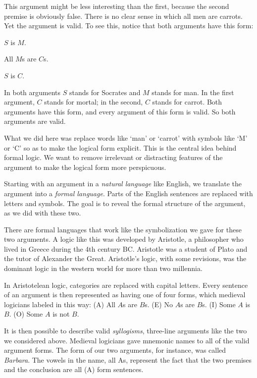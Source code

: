 This argument might be less interesting than the first, because the second premise is obviously false. There is no clear sense in which all men are carrots. Yet the argument is valid. To see this, notice that both arguments have this form:

\begin{earg}
\item[] $S$ is $M$.
\item[] All $M$s are $C$s.
\item[\therefore] $S$ is $C$.
\end{earg}

In both arguments $S$ stands for Socrates and $M$ stands for man. In the first argument, $C$ stands for mortal; in the second, $C$ stands for carrot. Both arguments have this form, and every argument of this form is valid. So both arguments are valid.


What we did here was replace words like `man' or `carrot' with symbols like `M' or `C' so as to make the logical form explicit. This is the central idea behind formal logic. We want to remove irrelevant or distracting features of the argument to make the logical form more perspicuous.

Starting with an argument in a \emph{natural language} like English, we translate the argument into a \emph{formal language}. Parts of the English sentences are replaced with letters and symbols. The goal is to reveal the formal structure of the argument, as we did with these two.

There are formal languages that work like the symbolization we gave for these two arguments. A logic like this was developed by Aristotle, a philosopher who lived in Greece during the 4th century BC. Aristotle was a student of Plato and the tutor of Alexander the Great. Aristotle's logic, with some revisions, was the dominant logic in the western world for more than two millennia.

In Aristotelean logic, categories are replaced with capital letters. Every sentence of an argument is then represented as having one of four forms, which medieval logicians labeled in this way: (A) All $A$s are $B$s. (E) No $A$s are $B$s. (I) Some $A$ is $B$. (O) Some $A$ is not $B$.

It is then possible to describe valid \emph{syllogisms}, three-line arguments like the two we considered above. Medieval logicians gave mnemonic names to all of the valid argument forms. The form of our two arguments, for instance, was called \emph{Barbara}. The vowels in the name, all As, represent the fact that the two premises and the conclusion are all (A) form sentences.

